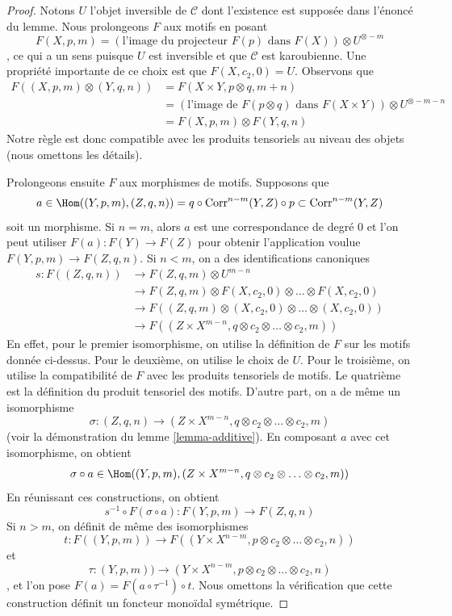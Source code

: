 \begin{proof}
Notons $U$ l'objet inversible de $\mathcal{C}$ dont l'existence
est supposée dans l'énoncé du lemme. Nous prolongeons $F$ aux motifs en posant
$$
F(X, p, m) = \left(\text{l'image du
projecteur }F(p)\text{ dans }F(X)\right) \otimes U^{\otimes -m}
$$,
ce qui a un sens puisque $U$ est inversible et que $\mathcal{C}$
est karoubienne. Une propriété importante de ce choix est que
$F(X, c_2, 0) = U$. Observons que
\begin{align*}
F((X, p, m) \otimes (Y, q, n))
& =
F(X \times Y, p \otimes q, m + n) \\
& =
\left(\text{l'image de }F(p \otimes q)\text{ dans }F(X \times Y)\right)
\otimes U^{\otimes -m - n} \\
& =
F(X, p, m) \otimes F(Y, q, n)
\end{align*}
Notre règle est donc compatible avec les produits tensoriels
au niveau des objets (nous omettons les détails).

\medskip\noindent
Prolongeons ensuite $F$ aux morphismes de motifs. Supposons que
$$
a \in
\Hom((Y, p, m), (Z, q, n)) =
q \circ \text{Corr}^{n - m}(Y, Z) \circ p \subset \text{Corr}^{n - m}(Y, Z)
$$
soit un morphisme. Si $n = m$, alors $a$ est une correspondance de degré $0$
et l'on peut utiliser $F(a) : F(Y) \to F(Z)$ pour obtenir l'application voulue
$F(Y, p, m) \to F(Z, q, n)$. Si $n < m$, on a des identifications canoniques
\begin{align*}
s : F((Z, q, n))
& \to
F(Z, q, m) \otimes U^{m - n} \\
& \to
F(Z, q, m) \otimes F(X, c_2, 0) \otimes \ldots \otimes F(X, c_2, 0) \\
& \to
F((Z, q, m) \otimes (X, c_2, 0) \otimes \ldots \otimes (X, c_2, 0)) \\
& \to
F((Z \times X^{m - n}, q \otimes c_2 \otimes \ldots \otimes c_2, m))
\end{align*}
En effet, pour le premier isomorphisme, on utilise la définition de $F$ sur les motifs
donnée ci-dessus. Pour le deuxième, on utilise le choix de $U$. Pour le troisième,
on utilise la compatibilité de $F$ avec les produits tensoriels de motifs.
Le quatrième est la définition du produit tensoriel des motifs. D'autre part,
on a de même un isomorphisme
$$
\sigma : (Z, q, n) \to
(Z \times X^{m - n}, q \otimes c_2 \otimes \ldots \otimes c_2, m)
$$
(voir la démonstration du lemme \ref{lemma-additive}). En composant $a$ avec cet isomorphisme,
on obtient
$$
\sigma \circ a \in
\Hom((Y, p, m),
(Z \times X^{m - n}, q \otimes c_2 \otimes \ldots \otimes c_2, m))
$$
En réunissant ces constructions, on obtient
$$
s^{-1} \circ F(\sigma \circ a) :
F(Y, p, m) \to
F(Z, q, n)
$$
Si $n > m$, on définit de même des isomorphismes
$$
t : F((Y, p, m)) \to
F((Y \times X^{n - m}, p \otimes c_2 \otimes \ldots \otimes c_2, n))
$$
et
$$
\tau : (Y, p, m)) \to
(Y \times X^{n - m}, p \otimes c_2 \otimes \ldots \otimes c_2, n)
$$,
et l'on pose $F(a) = F(a \circ \tau^{-1}) \circ t$.
Nous omettons la vérification que cette construction définit un foncteur
monoïdal symétrique.
\end{proof}

